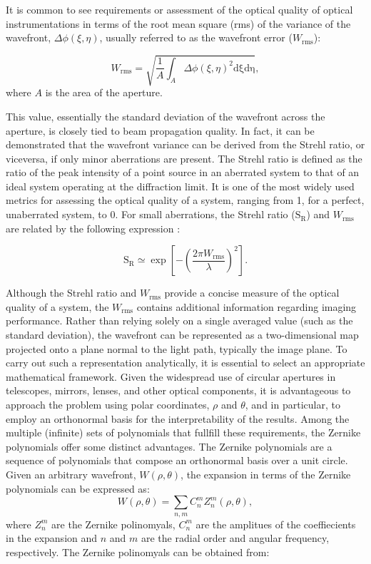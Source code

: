 It is common to see requirements or assessment of the optical quality of optical instrumentations in terms of the root mean square (rms) of the variance of the wavefront, $\Delta \phi (\xi, \eta)$, usually referred to as the wavefront error ($W_{\text{rms}}$):

\begin{equation}
  W_{\text{rms}} = \sqrt{\frac{1}{A}\int _ {A} \Delta \phi  \left(\xi, \eta \right) ^2 \mathrm{d \xi}\mathrm{d \eta}},
\end{equation}
where $A$ is the area of the aperture. 

This value, essentially the standard deviation of the wavefront across the aperture, is closely tied to beam propagation quality. In fact, it can be demonstrated that the wavefront variance can be derived from the Strehl ratio, or viceversa, if only minor aberrations are present. The Strehl ratio is defined as the ratio of the peak intensity of a point source in an aberrated system to that of an ideal system operating at the diffraction limit. It is one of the most widely used metrics for assessing the optical quality of a system, ranging from 1, for a perfect, unaberrated system, to 0. For small aberrations, the Strehl ratio ($\text{S}_\text{R}$) and $W_{\text{rms}}$ are related by the following expression \citep{WFE_def}: 

\begin{equation}
  \text{S}_\text{R} \simeq \exp \left[ - \left(\frac{2\pi W_{\text{rms}}}{\lambda}\right) ^2 \right].
\end{equation}

Although the Strehl ratio and $W_{\text{rms}}$ provide a concise measure of the optical quality of a system, the $W_{\text{rms}}$ contains additional information regarding imaging performance. Rather than relying solely on a single averaged value (such as the standard deviation), the wavefront can be represented as a two-dimensional map projected onto a plane normal to the light path, typically the image plane. To carry out such a representation analytically, it is essential to select an appropriate mathematical framework. Given the widespread use of circular apertures in telescopes, mirrors, lenses, and other optical components, it is advantageous to approach the problem using polar coordinates, $\rho$ and $\theta$, and in particular, to employ an orthonormal basis for the interpretability of the results. Among the multiple (infinite) sets of polynomials that fullfill these requirements, the Zernike polynomials \citep{Zernike} offer some distinct advantages. The Zernike polynomials are a sequence of polynomials that compose an orthonormal basis over a unit circle. Given an arbitrary wavefront, $W(\rho, \theta)$, the expansion in terms of the Zernike polynomials can be expressed as:
\begin{equation}
  W(\rho, \theta) = \sum_{n, m} C _n ^m Z _ n ^m(\rho, \theta),
\end{equation}
where $Z _n ^m$ are the Zernike polinomyals, $C_n ^m$ are the amplitues of the coeffiecients in the expansion and $n$ and $m$ are the radial order and angular frequency, respectively. The Zernike polinomyals can be obtained from:

